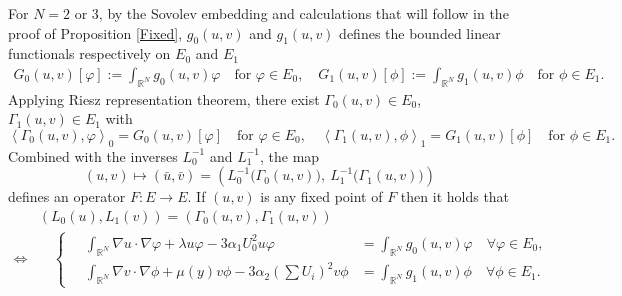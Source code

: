 \documentclass[a4paper,11pt]{article}
\numberwithin{step}{dummy}
\begin{document}
For $N=2$ or $3$, by the Sovolev embedding and calculations that will follow in the proof of Proposition \ref{Fixed}, $g_0(u,v)$ and $g_1(u,v)$ {defines the bounded linear functionals respectively on $E_0$ and $E_1$} 
\begin{align*}
 G_0(u,v)[\varphi]:=\int_{ \mathbb{R}^N} g_0(u,v)\varphi \quad \text{for $\varphi \in E_0$}, \quad
 G_1(u,v)[\phi]:=\int_{ \mathbb{R}^N} g_1(u,v)\phi \quad \text{for $\phi \in E_1$}.
\end{align*}
Applying Riesz representation theorem, there exist $\Gamma_0(u,v) \in E_0$, $\Gamma_1(u,v) \in E_1$ with
$$\left<\Gamma_0(u,v),\varphi\right>_0 = G_0(u,v)[\varphi] \quad \text{for $\varphi \in E_0$}, \quad \left<\Gamma_1(u,v),\phi\right>_1 = G_1(u,v)[\phi] \quad \text{for $\phi \in E_1$}.$$
Combined with the inverses $L_0^{-1}$ and $L_1^{-1}$, the map
$$(u,v) \mapsto (\bar{u},\bar{v})=\left(L_0^{-1}\Big(\Gamma_0(u,v)\Big), ~L_1^{-1}\Big(\Gamma_1(u,v)\Big)\right)$$
defines an operator $F: E \rightarrow E$. If $(u,v)$ is any fixed point of $F$ then it holds that
\begin{align*}
 &\left(L_0(u),L_1(v)\right) = \left(\Gamma_0(u,v),\Gamma_1(u,v)\right)\\
 \Longleftrightarrow &
 \quad\left\{ \quad
 \begin{aligned}
  \int_{\mathbb{R}^N} \nabla u \cdot \nabla \varphi + \lambda u\varphi - 3\alpha_1U_0^2 u\varphi &= \int_{\mathbb{R}^N} g_0(u,v)\varphi \quad \forall \varphi\in E_0,\\
  \int_{\mathbb{R}^N} \nabla v \cdot \nabla \phi + \mu(y) v\phi - 3\alpha_2\left(\sum U_i\right)^2v\phi &= \int_{\mathbb{R}^N} g_1(u,v)\phi \quad \forall \phi \in E_1.
 \end{aligned}
 \right.
\end{align*}
\end{document}
